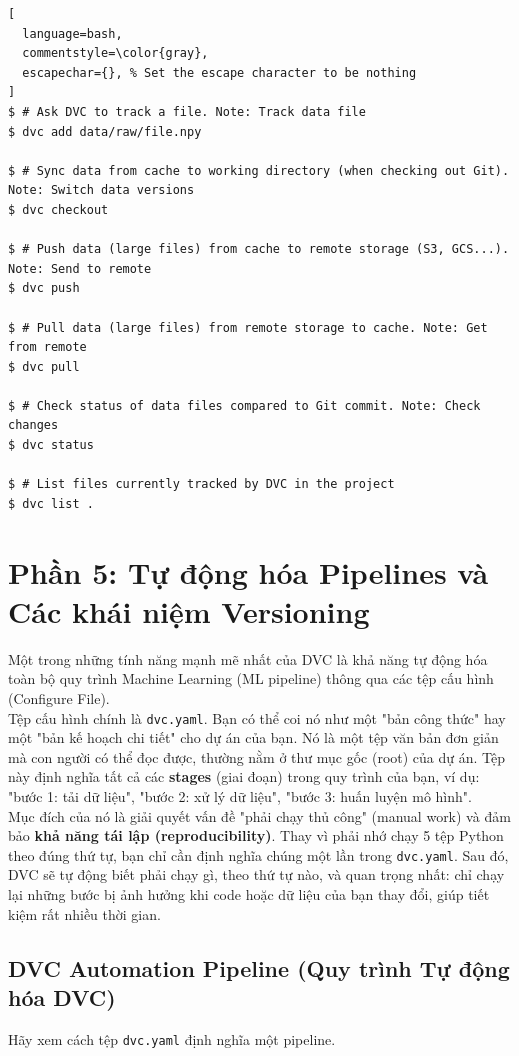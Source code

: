 \documentclass[11pt]{article}
\begin{document}
\begin{lstlisting}[
  language=bash,
  commentstyle=\color{gray},
  escapechar={}, % Set the escape character to be nothing
]
$ # Ask DVC to track a file. Note: Track data file
$ dvc add data/raw/file.npy

$ # Sync data from cache to working directory (when checking out Git). Note: Switch data versions
$ dvc checkout

$ # Push data (large files) from cache to remote storage (S3, GCS...). Note: Send to remote
$ dvc push

$ # Pull data (large files) from remote storage to cache. Note: Get from remote
$ dvc pull

$ # Check status of data files compared to Git commit. Note: Check changes
$ dvc status

$ # List files currently tracked by DVC in the project
$ dvc list .
\end{lstlisting}




\section{Phần 5: Tự động hóa Pipelines và Các khái niệm Versioning}
Một trong những tính năng mạnh mẽ nhất của DVC là khả năng tự động hóa toàn bộ quy trình Machine Learning (ML pipeline) thông qua các tệp cấu hình (Configure File). \\

Tệp cấu hình chính là \texttt{dvc.yaml}. Bạn có thể coi nó như một "bản công thức" hay một "bản kế hoạch chi tiết" cho dự án của bạn. Nó là một tệp văn bản đơn giản mà con người có thể đọc được, thường nằm ở thư mục gốc (root) của dự án. Tệp này định nghĩa tất cả các \textbf{stages} (giai đoạn) trong quy trình của bạn, ví dụ: "bước 1: tải dữ liệu", "bước 2: xử lý dữ liệu", "bước 3: huấn luyện mô hình". \\

Mục đích của nó là giải quyết vấn đề "phải chạy thủ công" (manual work) và đảm bảo \textbf{khả năng tái lập (reproducibility)}. Thay vì phải nhớ chạy 5 tệp Python theo đúng thứ tự, bạn chỉ cần định nghĩa chúng một lần trong \texttt{dvc.yaml}. Sau đó, DVC sẽ tự động biết phải chạy gì, theo thứ tự nào, và quan trọng nhất: chỉ chạy lại những bước bị ảnh hưởng khi code hoặc dữ liệu của bạn thay đổi, giúp tiết kiệm rất nhiều thời gian. \\

\subsection{DVC Automation Pipeline (Quy trình Tự động hóa DVC)}
Hãy xem cách tệp \texttt{dvc.yaml} định nghĩa một pipeline.
\end{document}
